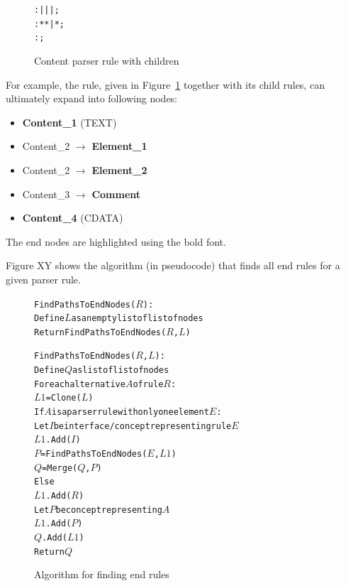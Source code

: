 \begin{figure}[ht]
\centering
\begin{framed}
\begin{alltt}
	 :  |  |  |  ;
	 : \antlrliteral{<}  * \antlrliteral{>} * \antlrliteral{</}  \antlrliteral{>} | \antlrliteral{<}  * \antlrliteral{/>} ;
	 : \antlrliteral{<!--}  \antlrliteral{-->} ;
\end{alltt}
\end{framed}
\caption{Content parser rule with children}
\label{fig:contentrulewithchildren}
\end{figure}

For example, the  rule, given in Figure~\ref{fig:contentrulewithchildren} together with its child rules, can ultimately expand into following nodes:

\begin{itemize}
	\itemsep0em
	\item \textbf{Content{\_}1} (TEXT)
	\item Content{\_}2 $\rightarrow$ \textbf{Element{\_}1}
	\item Content{\_}2 $\rightarrow$ \textbf{Element{\_}2}
	\item Content{\_}3 $\rightarrow$ \textbf{Comment}
	\item \textbf{Content{\_}4} (CDATA)
\end{itemize}

The end nodes are highlighted using the bold font.

Figure XY shows the algorithm (in pseudocode) that finds all end rules for a given parser rule.

\begin{figure}[ht]
\centering
\begin{framed}
\begin{alltt}
	FindPathsToEndNodes($R$):
	  Define $L$ as an empty list of list of nodes
	  Return FindPathsToEndNodes($R$, $L$)

	FindPathsToEndNodes($R$, $L$):
	  Define $Q$ as list of list of nodes
	  For each alternative $A$ of rule $R$:
	    $L1$ = Clone($L$)
	    If $A$ is a parser rule with only one element $E$:
	      Let $I$ be interface/concept representing rule $E$
	      $L1$.Add($I$)
	      $P$ = FindPathsToEndNodes($E$, $L1$)
	      $Q$ = Merge($Q$, $P$)
	    Else
	      $L1$.Add($R$)
	      Let $P$ be concept representing $A$
	      $L1$.Add($P$)
	      $Q$.Add($L1$)
	  Return $Q$
\end{alltt}
\end{framed}
\caption{Algorithm for finding end rules}
\label{fig:shortcut_algorithm}
\end{figure}

